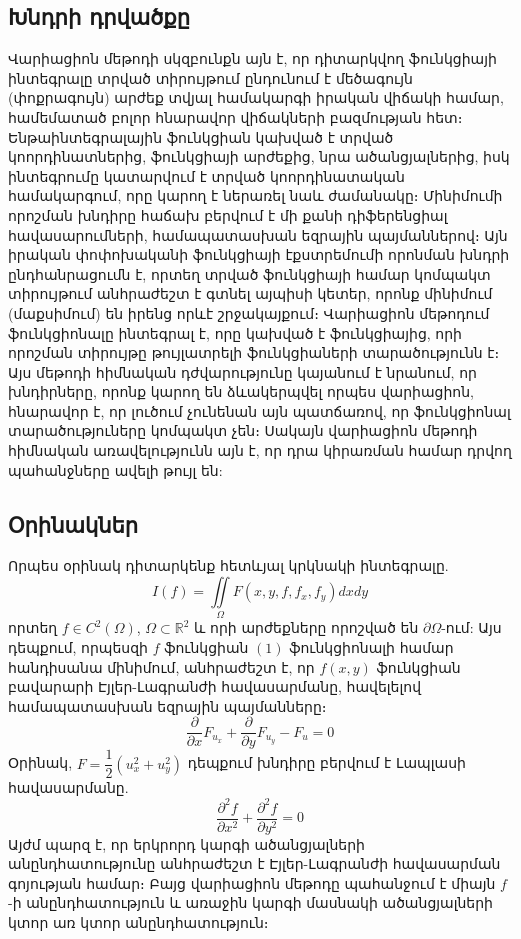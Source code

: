 \documentclass[fleqn, bachelor,subf,12pt,notitlepage]{article}
\begin{document}
\subsection*{Խնդրի դրվածքը}
\hspace{\parindent}Վարիացիոն մեթոդի սկզբունքն այն է, որ դիտարկվող ֆունկցիայի ինտեգրալը տրված տիրույթում ընդունում է մեծագույն (փոքրագույն) արժեք տվյալ համակարգի իրական վիճակի համար, համեմատած բոլոր հնարավոր վիճակների բազմության հետ։  Ենթաինտեգրալային ֆունկցիան կախված է տրված կոորդինատներից, ֆունկցիայի արժեքից, նրա ածանցյալներից, իսկ ինտեգրումը կատարվում է տրված կոորդինատական համակարգում, որը կարող է ներառել նաև ժամանակը։ Մինիմումի որոշման խնդիրը հաճախ բերվում է մի քանի դիֆերենցիալ հավասարումների, համապատասխան եզրային պայմաններով։  Այն իրական փոփոխականի ֆունկցիայի էքստրեմումի որոնման խնդրի ընդհանրացումն է, որտեղ տրված ֆունկցիայի համար կոմպակտ տիրույթում անհրաժեշտ է գտնել այպիսի կետեր, որոնք մինիմում (մաքսիմում) են իրենց որևէ շրջակայքում։
Վարիացիոն մեթոդում ֆունկցիոնալը ինտեգրալ է, որը կախված է ֆունկցիայից, որի որոշման տիրույթը թույլատրելի ֆունկցիաների  տարածությունն է։
Այս  մեթոդի հիմնական դժվարությունը կայանում է նրանում, որ խնդիրները, որոնք կարող են ձևակերպվել որպես վարիացիոն, հնարավոր է, որ լուծում չունենան այն պատճառով, որ ֆունկցիոնալ տարածություները  կոմպակտ չեն։
Սակայն վարիացիոն մեթոդի հիմնական առավելությունն այն է, որ դրա կիրառման համար դրվող պահանջները ավելի թույլ են:
\newpage
\subsection*{{Օրինակներ}}
\hspace{\parindent}Որպես օրինակ դիտարկենք հետևյալ կրկնակի ինտեգրալը.
\begin{equation}
I\left(f\right)=\iint \limits_{\Omega} F\left(x, y, f, f_{x}, f_{y}\right)dxdy
\end{equation}
որտեղ $f \in C^{2}(\Omega)$,  $\Omega\subset \mathbb{R}^{2}$ և որի արժեքները որոշված են $\partial \Omega$-ում:
Այս դեպքում, որպեսզի $f$ ֆունկցիան $\left(1\right)$ ֆունկցիոնալի համար հանդիսանա մինիմում, անհրաժեշտ է, որ $f(x,y)$ ֆունկցիան բավարարի Էյլեր-Լագրանժի հավասարմանը, հավելելով համապատասխան եզրային պայմանները։
\begin{equation}
\dfrac{\partial}{\partial x}F_{u_{x}} + \dfrac{\partial}{\partial y}F_{u_{y}} - F_{u} = 0
\end{equation}
Օրինակ, $F = \dfrac{1}{2}\left(u_{x}^2+u_{y}^2\right)$ դեպքում խնդիրը բերվում է Լապլասի հավասարմանը.
\begin{equation}
\dfrac{\partial^{2}f}{\partial x^{2}} + \dfrac{\partial^{2}f}{\partial y^{2}} = 0
\end{equation}
Այժմ պարզ է, որ երկրորդ կարգի ածանցյալների անընդհատությունը անհրաժեշտ է Էյլեր-Լագրանժի հավասարման գոյության համար։ Բայց վարիացիոն մեթոդը պահանջում է միայն $f$-ի անընդհատություն և առաջին կարգի մասնակի ածանցյալների կտոր առ կտոր անընդհատություն։
\end{document}
